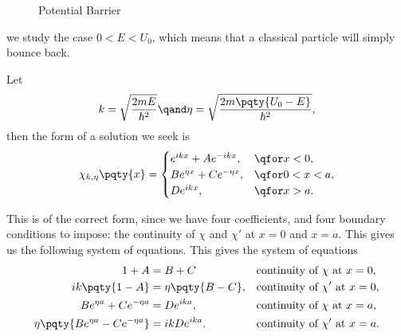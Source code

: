 \begin{figure}[ht!]
        \centering
    \caption{Potential Barrier}
    \label{fig:potential-barrier}%
\end{figure}
we study the case \(0 < E < U_0\), which means that a classical particle will simply bounce back.

Let
\begin{equation}
    k = \sqrt{\frac{2 m E}{\hbar^2}} \qand \eta = \sqrt{\frac{2 m \pqty{U_0 - E}}{\hbar^2}},
\end{equation}
then the form of a solution we seek is
\begin{equation}
    \chi_{k, \eta} \pqty{x} = \begin{cases}
        e^{i k x} + A e^{- i k x}, & \qfor x < 0, \\
        B e^{\eta x} + C e^{- \eta x}, & \qfor 0 < x < a, \\
        D e^{i k x}, & \qfor x > a.
    \end{cases}
\end{equation}

This is of the correct form, since we have four coefficients, and four boundary conditions to impose: the continuity of \(\chi\) and \(\chi'\) at \(x = 0\) and \(x = a\). This gives us the following system of equations. This gives the system of equations
\begin{subequations}
    \begin{align}
        1 + A &= B + C && \text{continuity of } \chi \text{ at } x = 0, \\
        i k \pqty{1 - A} &= \eta \pqty{B - C}, && \text{continuity of } \chi' \text{ at } x = 0, \\
        B e^{\eta a} + C e^{- \eta a} &= D e^{i k a}, && \text{continuity of } \chi \text{ at } x = a, \\
        \eta \pqty{B e^{\eta a} - C e^{- \eta a}} &= i k D e^{i k a}. && \text{continuity of } \chi' \text{ at } x = a.
    \end{align}
\end{subequations}

